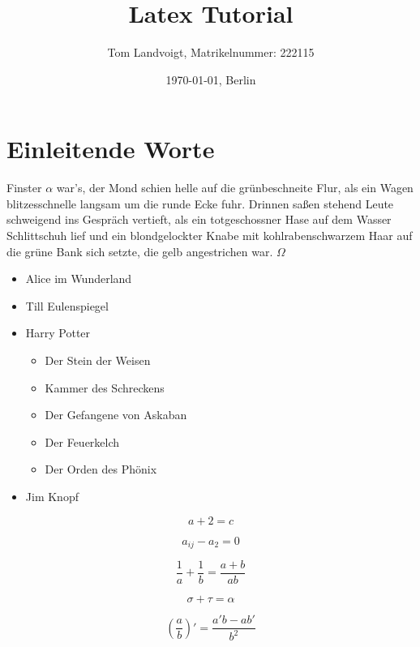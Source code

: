 \documentclass[12pt]{scrreprt}
\title{Latex Tutorial}
\author{Tom Landvoigt, Matrikelnummer: 222115}
\date{\today{}, Berlin}
\begin{document}
\maketitle
\tableofcontents

\section{Einleitende Worte}
\label{sec:einleitende-worte}

Finster $ \alpha $ war's, der Mond schien helle auf die grünbeschneite Flur, als ein Wagen blitzesschnelle langsam um die runde Ecke fuhr. Drinnen saßen stehend Leute schweigend ins Gespräch vertieft, als ein  totgeschossner Hase auf dem Wasser Schlittschuh lief und ein blondgelockter Knabe mit kohlrabenschwarzem Haar auf die grüne Bank sich setzte, die gelb angestrichen war. $\Omega$

\begin{itemize}
  \item Alice im Wunderland
  \item Till Eulenspiegel
  \item Harry Potter
  \begin{itemize}
    \item Der Stein der Weisen
    \item Kammer des Schreckens
    \item Der Gefangene von Askaban
    \item Der Feuerkelch
    \item Der Orden des Phönix
  \end{itemize}
  \item Jim Knopf
\end{itemize}

\begin{equation*}
  a + 2 = c
\end{equation*}

\begin{equation*}
  a_{ij} - a_2 = 0
\end{equation*}

\begin{equation*}
  \frac{1}{a} + \frac{1}{b} = \frac{a+b}{ab}
\end{equation*}

\begin{equation*}
  \sigma + \tau = \alpha
\end{equation*}

\begin{equation}
  \label{eq:1}
  \left( \frac{a}{b} \right)' = \frac{a'b-ab'}{b^{2}}
\end{equation} 
\end{document}
